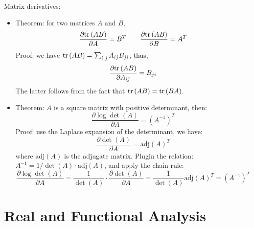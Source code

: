 \documentclass{report}
\begin{document}
Matrix derivatives: 
\begin{itemize}
\item Theorem: for two matrices $A$ and $B$, 
\begin{equation}
\frac{\partial {\rm tr}\,(AB)}{\partial A} = B^T	\qquad \frac{\partial {\rm tr}\,(AB)}{\partial B} = A^T
\end{equation}
Proof: we have ${\rm tr}\,(AB) = \sum_{i,j} A_{ij} B_{ji}$, thus, 
\begin{equation}
\frac{\partial {\rm tr}\,(AB)}{\partial A_{ij}} = B_{ji}	
\end{equation}
The latter follows from the fact that ${\rm tr}\,(AB) = {\rm tr}\,(BA)$. 

\item Theorem: $A$ is a square matrix with positive determinant, then: 
\begin{equation}
\frac{\partial \log \det(A)}{\partial A} = (A^{-1})^T
\end{equation}
Proof: use the Laplace expansion of the determinant, we have: 
\begin{equation}
\frac{\partial \det(A)}{\partial A} = \text{adj}(A)^T	
\end{equation}
where $\text{adj}(A)$ is the adjugate matrix. Plugin the relation: $A^{-1} = 1/\det(A) \cdot \text{adj}(A)$, and apply the chain rule: 
\begin{equation}
\frac{\partial \log \det(A)}{\partial A} = \frac{1}{\det(A)} \cdot \frac{\partial \det(A)}{\partial A} = \frac{1}{\det(A)} \text{adj}(A)^T = (A^{-1})^T
\end{equation}
 
\end{itemize}
\section{Real and Functional Analysis}
\end{document}
